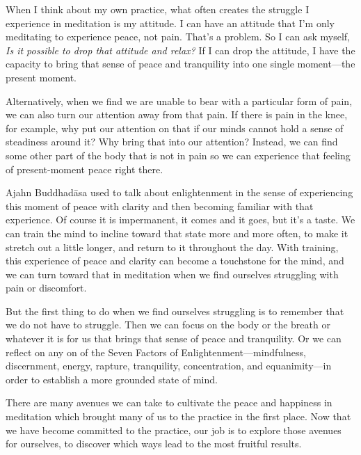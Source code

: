 When I think about my own practice, what often creates the struggle I 
experience in meditation is my attitude. I can have an attitude that 
I'm only meditating to experience peace, not pain. That's a problem. So 
I can ask myself, \emph{Is it possible to drop that attitude and 
relax?} If I can drop the attitude, I have the capacity to bring that 
sense of peace and tranquility into one single moment---the present 
moment.

Alternatively, when we find we are unable to bear with a particular 
form of pain, we can also turn our attention away from that pain. If 
there is pain in the knee, for example, why put our attention on that 
if our minds cannot hold a sense of steadiness around it? Why bring 
that into our attention? Instead, we can find some other part of the 
body that is not in pain so we can experience that feeling of 
present-moment peace right there.

Ajahn Buddhadāsa used to talk about enlightenment in the sense of 
experiencing this moment of peace with clarity and then becoming 
familiar with that experience. Of course it is impermanent, it comes 
and it goes, but it's a taste. We can train the mind to incline toward 
that state more and more often, to make it stretch out a little longer, 
and return to it throughout the day. With training, this experience of 
peace and clarity can become a touchstone for the mind, and we can turn 
toward that in meditation when we find ourselves struggling with pain 
or discomfort.

But the first thing to do when we find ourselves struggling is to 
remember that we do not have to struggle. Then we can focus on the body 
or the breath or whatever it is for us that brings that sense of peace 
and tranquility. Or we can reflect on any on of the Seven Factors of 
Enlightenment---mindfulness, discernment, energy, rapture, tranquility, 
concentration, and equanimity---in order to establish a more grounded 
state of mind.

There are many avenues we can take to cultivate the peace and happiness 
in meditation which brought many of us to the practice in the first 
place. Now that we have become committed to the practice, our job is to 
explore those avenues for ourselves, to discover which ways lead to the 
most fruitful results.


